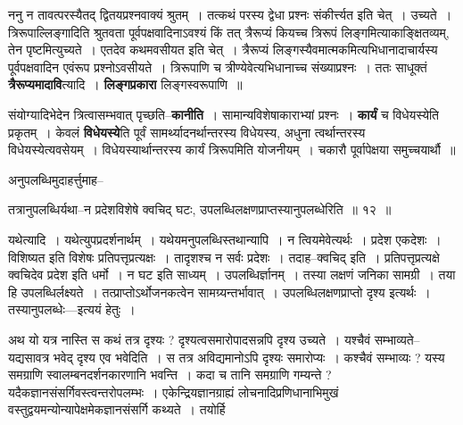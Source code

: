 \documentclass[article,12pt,a4paper]{memoir}
\begin{document}
	  \pstart ननु न तावत्परस्यैतद् द्वितयप्रश्नवाक्यं श्रुतम् । तत्कथं परस्य द्वेधा प्रश्नः संकीर्त्त्यत इति चेत् । उच्यते । त्रिरूपाल्लिङ्गादिति श्रुतवता पूर्वपक्षवादिनाऽवश्यं किं तत् त्रैरूप्यं कियच्च त्रिरूपं लिङ्गमित्याकाङ्क्षितव्यम्, तेन पृष्टमित्युच्यते । एतदेव कथमवसीयत इति चेत् । त्रैरूप्यं लिङ्गस्यैवमात्मकमित्यभिधानादाचार्यस्य पूर्वपक्षवादिन एवंरूप प्रश्नोऽवसीयते । त्रिरूपाणि च त्रीण्येवेत्यभिधानाच्च संख्याप्रश्नः । ततः साधूक्तं \textbf{त्रैरूप्यमादावि}त्यादि । \textbf{लिङ्गप्रकारा} लिङ्गस्वरूपाणि ॥
	\pend
      

	  \pstart संयोग्यादिभेदेन त्रित्वासम्भवात् पृच्छति--\textbf{कानीति} । सामान्यविशेषाकाराभ्यां प्रश्नः । \textbf{कार्यं} च विधेयस्येति प्रकृतम् । केवलं \textbf{विधेयस्ये}ति पूर्वं सामर्थ्यादनर्थान्तरस्य विधेयस्य, अधुना त्वर्थान्तरस्य विधेयस्येत्यवसेयम् । विधेयस्यार्थान्तरस्य कार्यं त्रिरूपमिति योजनीयम् । चकारौ पूर्वापेक्षया समुच्चयार्थौ ॥
	\pend
	  \bigskip
	  \begingroup
	

	  \pstart अनुपलब्धिमुदाहर्त्तुमाह--
	\pend
        
	  \bigskip
	  \begingroup
	

	  \pstart तत्रानुपलब्धिर्यथा--न प्रदेशविशेषे क्वचिद् घटः, उपलब्धिलक्षणप्राप्तस्यानुपलब्धेरिति ॥ १२ ॥
	\pend
      
	  \endgroup
	 

	  \pstart यथेत्यादि । यथेत्युपप्रदर्शनार्थम् । यथेयमनुपलब्धिस्तथान्यापि । न त्वियमेवेत्यर्थः । प्रदेश एकदेशः । विशिष्यत इति विशेषः प्रतिपत्तृप्रत्यक्षः । तादृशश्च न सर्वः प्रदेशः । तदाह--क्वचिद् इति । प्रतिपत्तृप्रत्यक्षे क्वचिदेव प्रदेश इति धर्मो । न घट इति साध्यम् । उपलब्धिर्ज्ञानम् । तस्या लक्षणं जनिका सामग्री । तया हि उपलब्धिर्लक्ष्यते । तत्प्राप्तोऽर्थोजनकत्वेन सामग्र्यन्तर्भावात् । उपलब्धिलक्षणप्राप्तो दृश्य इत्यर्थः । तस्यानुपलब्धेः—इत्ययं हेतुः ।
	\pend
        

	  \pstart अथ यो यत्र नास्ति स कथं तत्र दृश्यः ? दृश्यत्वसमारोपादसन्नपि दृश्य उच्यते । यश्चैवं सम्भाव्यते--यद्यसावत्र भवेद् दृश्य एव भवेदिति । स तत्र अविद्यमानोऽपि दृश्यः समारोप्यः । कश्चैवं सम्भाव्यः ? यस्य समग्राणि स्वालम्बनदर्शनकारणानि भवन्ति । कदा च तानि समग्राणि गम्यन्ते ? यदैकज्ञानसंसर्गिवस्त्वन्तरोपलम्भः । एकेन्द्रियज्ञानग्राह्यं लोचनादिप्रणिधानाभिमुखं वस्तुद्वयमन्योन्यापेक्षमेकज्ञानसंसर्गि कथ्यते । तयोर्हि
	\pend
      
\end{document}
